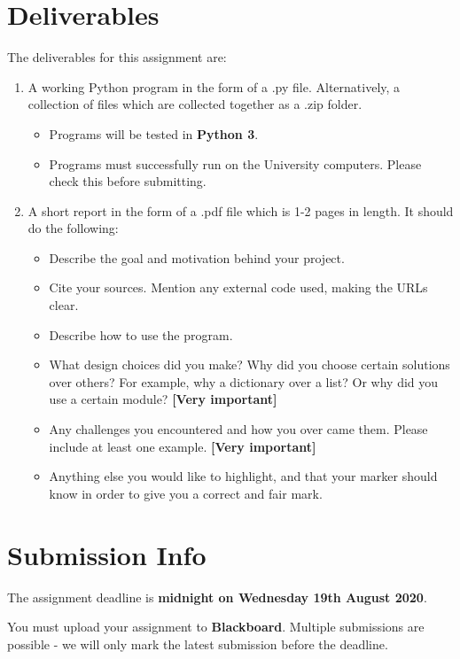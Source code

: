 \documentclass[12pt]{report}
\begin{document}
\section*{Deliverables}
The deliverables for this assignment are:
\begin{enumerate}
    \item A working Python program in the form of a .py file. Alternatively, a collection of files which are collected together as a .zip folder.
    \begin{itemize}
        \item Programs will be tested in \textbf{Python 3}.
        \item Programs must successfully run on the University computers. Please check this before submitting.
    \end{itemize}
    \item A short report in the form of a .pdf file which is 1-2 pages in length. It should do the following:
    \begin{itemize}
        \item Describe the goal and motivation behind your project.
        \item Cite your sources. Mention any external code used, making the URLs clear.
        \item Describe how to use the program.
        \item What design choices did you make? Why did you choose certain solutions over others? For example, why a dictionary over a list? Or why did you use a certain module? \textbf{[Very important]}
        \item Any challenges you encountered and how you over came them. Please include at least one example. \textbf{[Very important]}
        \item Anything else you would like to highlight, and that your marker should know in order to give you a correct and fair mark.
    \end{itemize}
\end{enumerate}

\section*{Submission Info}
The assignment deadline is \textbf{midnight on Wednesday  19th August 2020}. 

\bigskip

You must upload your assignment to \textbf{Blackboard}. Multiple submissions are possible - we will only mark the latest submission before the deadline.
\end{document}
